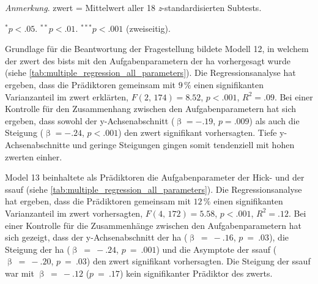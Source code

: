 \documentclass[11pt, twoside, a4paper]{book}		%
\begin{document}
\begin{table}[b]
\begin{adjustbox}{width=1\textwidth}
\begin{threeparttable}
			\begin{tablenotes}[flushleft]
				\footnotesize				%
				\setlength{}	%
				\item \textit{Anmerkung}. \gls{zwert} = Mittelwert aller 18 \textit{z}-standardisierten Subtests.
				\item {$^{*}$}$p<.05$. {$^{**}$}$p<.01$. {$^{***}$}$p<.001$ (zweiseitig).
			\end{tablenotes}
		\end{threeparttable}
	\end{adjustbox}
\end{table}



Grundlage für die Beantwortung der Fragestellung bildete Modell 12, in welchem der \gls{zwert} des \gls{bist}s mit den Aufgabenparametern der \gls{ha} vorhergesagt wurde (siehe \autoref{tab:multiple_regression_all_parameters}).
Die Regressionsanalyse hat ergeben, dass die Prädiktoren gemeinsam mit $9\,\%$ einen signifikanten Varianzanteil im \gls{zwert} erklärten, $F(2,\,174)=8.52$, $p<.001$, $R^2=.09$. Bei einer Kontrolle für den Zusammenhang zwischen den Aufgabenparametern hat sich ergeben, dass sowohl der y-Ach\-sen\-ab\-schnitt ($\upbeta=-.19$, $p=.009$) als auch die Steigung ($\upbeta=-.24$, $p<.001$) den \gls{zwert} signifikant vorhersagten. Tiefe y-Ach\-sen\-ab\-schnitte und geringe Steigungen gingen somit tendenziell mit hohen \gls{zwert}en einher.



Model 13 beinhaltete als Prädiktoren die Aufgabenparameter der Hick- und der \gls{ssauf} (siehe \autoref{tab:multiple_regression_all_parameters}). 
Die Regressionsanalyse hat ergeben, dass die Prädiktoren gemeinsam mit $12\,\%$ einen signifikanten Varianzanteil im \gls{zwert} vorhersagten, $F(4,\,172)=5.58$, $p<.001$, $R^2=.12$. Bei einer Kontrolle für die Zusammenhänge zwischen den Aufgabenparametern hat sich gezeigt, dass der y-Ach\-sen\-ab\-schnitt der \gls{ha}  ($\upbeta~=~-.16$, $p~=~.03$), die Steigung der \gls{ha} ($\upbeta~=~-.24$, $p~=~.001$) und die Asymptote der \gls{ssauf} ($\upbeta~=~-.20$, $p~=~.03$) den \gls{zwert} signifikant vorhersagten. Die Steigung der \gls{ssauf} war mit $\upbeta~=~-.12$ ($p~=~.17$) kein signifikanter Prädiktor des \gls{zwert}s.
\end{document}
